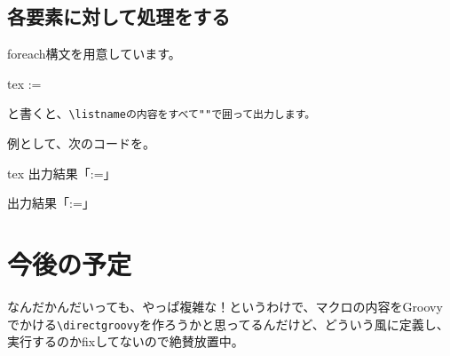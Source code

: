 \subsection{各要素に対して処理をする}
foreach構文を用意しています。
\begin{code}{tex}
\@foreach \@memory:=\listname{}
\end{code}
と書くと、\verb+\listnameの内容をすべて""で囲って出力します。+

例として、次のコードを。
\begin{code}{tex}
{%
\makeatletter %
\newlist\testlist %
\push{}
\push{}
\push{}
出力結果「\@foreach \@memory:=\testlist{}」
}
\end{code}
{
\makeatletter
\newlist\testlist
\push{}
\push{}
\push{}
出力結果「\@foreach \@memory:=\testlist{}」
}
\section{今後の予定}
なんだかんだいっても、やっぱ複雑な！というわけで、マクロの内容をGroovyでかける\verb+\directgroovy+を作ろうかと思ってるんだけど、どういう風に定義し、実行するのかfixしてないので絶賛放置中。

